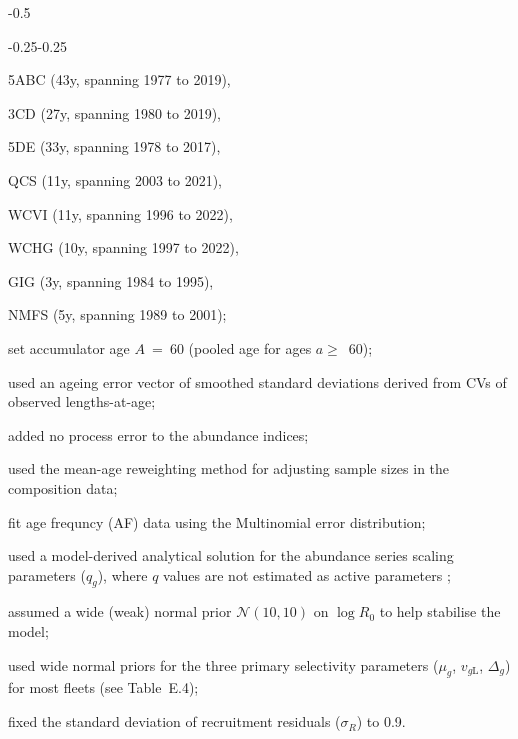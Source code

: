 \documentclass[11pt]{book}
\begin{document}
\begin{itemize_csas}{-0.5}{}
\begin{itemize_csas}{-0.25}{-0.25}
		\item 5ABC (43y, spanning 1977 to 2019),
		\item 3CD (27y, spanning 1980 to 2019),
		\item 5DE (33y, spanning 1978 to 2017),
		\item QCS (11y, spanning 2003 to 2021),
		\item WCVI (11y, spanning 1996 to 2022),
		\item WCHG (10y, spanning 1997 to 2022),
		\item GIG (3y, spanning 1984 to 1995),
		\item NMFS (5y, spanning 1989 to 2001);
	\end{itemize_csas}
	\item set accumulator age $A$~=~60 (pooled age for ages $a\geq$~60);
	\item used an ageing error vector of smoothed standard deviations derived from CVs of observed lengths-at-age;
	\item added no process error to the abundance indices;
	\item used the \citet{Francis:2011} mean-age reweighting method for adjusting sample sizes in the composition data;
	\item fit age frequncy (AF) data using the Multinomial error distribution;
	\item used a model-derived analytical solution for the abundance series scaling parameters ($q_g$), where $q$ values are not estimated as active parameters \citep{Methot-etal:2022};
	\item assumed a wide (weak) normal prior $\mathcal{N}(10,10)$ on $\log R_0$ to help stabilise the model; 
	\item used wide normal priors for the three primary selectivity parameters ($\mu_g$, $v_{g\text{L}}$, $\Delta_{g}$) for most fleets (see Table~E.4);
	\item fixed the standard deviation of recruitment residuals ($\sigma_R$) to 0.9.
\end{itemize_csas}
\end{document}
